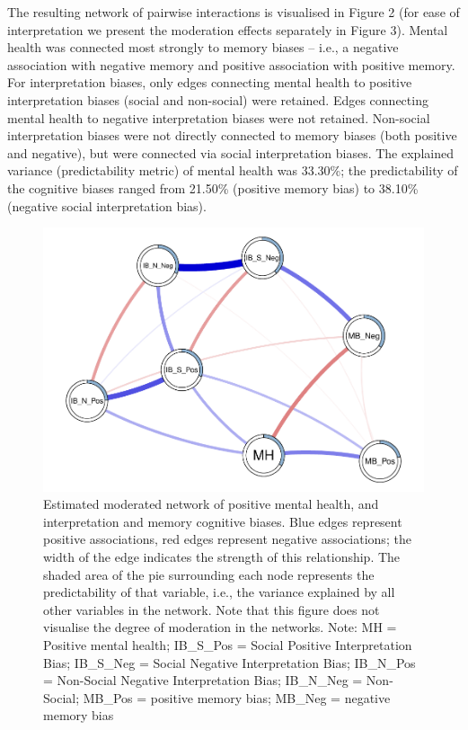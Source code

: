 \documentclass[man,floatsintext]{apa6}
\begin{document}
The resulting network of pairwise interactions is visualised in Figure 2 (for ease of interpretation we present the moderation effects separately in Figure 3). Mental health was connected most strongly to memory biases -- i.e., a negative association with negative memory and positive association with positive memory. For interpretation biases, only edges connecting mental health to positive interpretation biases (social and non-social) were retained. Edges connecting mental health to negative interpretation biases were not retained. Non-social interpretation biases were not directly connected to memory biases (both positive and negative), but were connected via social interpretation biases. The explained variance (predictability metric) of mental health was 33.30\%; the predictability of the cognitive biases ranged from 21.50\% (positive memory bias) to 38.10\% (negative social interpretation bias).

\begin{figure}
\centering
\includegraphics{script_files/figure-latex/unnamed-chunk-3-1.pdf}
\caption{\label{fig:unnamed-chunk-3}Estimated moderated network of positive mental health, and interpretation and memory cognitive biases. Blue edges represent positive associations, red edges represent negative associations; the width of the edge indicates the strength of this relationship. The shaded area of the pie surrounding each node represents the predictability of that variable, i.e., the variance explained by all other variables in the network. Note that this figure does not visualise the degree of moderation in the networks.
Note: MH = Positive mental health; IB\_S\_Pos = Social Positive Interpretation Bias; IB\_S\_Neg = Social Negative Interpretation Bias; IB\_N\_Pos = Non-Social Negative Interpretation Bias; IB\_N\_Neg = Non-Social; MB\_Pos = positive memory bias; MB\_Neg = negative memory bias}
\end{figure}
\end{document}
